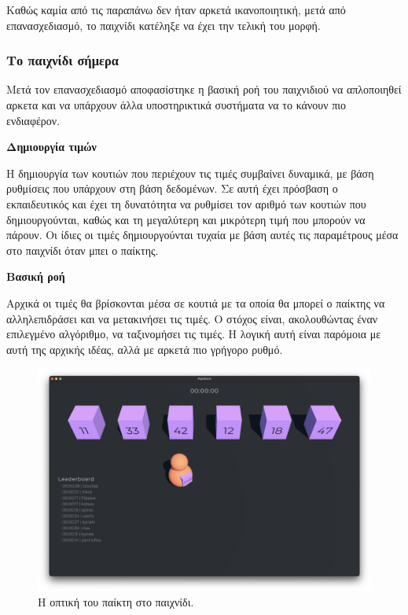 Καθώς καμία από τις παραπάνω δεν ήταν αρκετά ικανοποιητική, μετά από επανασχεδιασμό, το παιχνίδι κατέληξε να έχει την τελική του μορφή.


\subsubsection{Το παιχνίδι σήμερα}

Μετά τον επανασχεδιασμό αποφασίστηκε η βασική ροή του παιχνιδιού να απλοποιηθεί αρκετα και να υπάρχουν άλλα υποστηρικτικά συστήματα να το κάνουν πιο ενδιαφέρον.

\textbf{Δημιουργία τιμών}

Η δημιουργία των κουτιών που περιέχουν τις τιμές συμβαίνει δυναμικά, με βάση ρυθμίσεις που υπάρχουν στη βάση δεδομένων. Σε αυτή έχει πρόσβαση ο εκπαιδευτικός και έχει τη δυνατότητα να ρυθμίσει τον αριθμό των κουτιών που δημιουργούνται, καθώς και τη μεγαλύτερη και μικρότερη τιμή που μπορούν να πάρουν. Οι ίδιες οι τιμές δημιουργούνται τυχαία με βάση αυτές τις παραμέτρους μέσα στο παιχνίδι όταν μπει ο παίκτης.

\textbf{Βασική ροή}

Αρχικά οι τιμές θα βρίσκονται μέσα σε κουτιά με τα οποία θα μπορεί ο παίκτης να αλληλεπιδράσει και να μετακινήσει τις τιμές. Ο στόχος είναι, ακολουθώντας έναν επιλεγμένο αλγόριθμο, να ταξινομήσει τις τιμές. Η λογική αυτή είναι παρόμοια με αυτή της αρχικής ιδέας, αλλά με αρκετά πιο γρήγορο ρυθμό.

\begin{figure}[H]
    \centering
    \includegraphics[width=0.8\linewidth]{sections/4/2/images/game_solo}
    \caption{Η οπτική του παίκτη στο παιχνίδι.}
    \label{fig:game_solo}
\end{figure}

